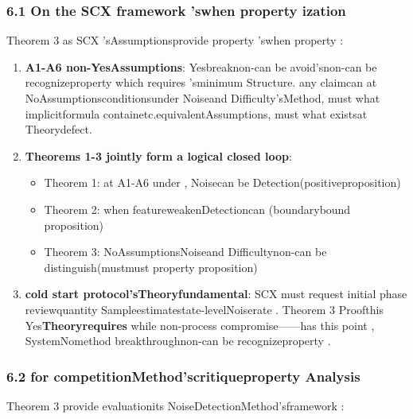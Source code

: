 \documentclass[
  12pt,
]{article}
\providecommand{\tightlist}{%
  \setlength{\itemsep}{0pt}\setlength{\parskip}{0pt}}
\begin{document}
\subsubsection{6.1 On the SCX
framework 'swhen property ization }\label{ux5bf9-scx-ux6846ux67b6ux7684ux6b63ux5f53ux6027ux5316}

Theorem 3 as  SCX 'sAssumptionsprovide property 'swhen property : 

\begin{enumerate}
\def\labelenumi{\arabic{enumi}.}
\item
  \textbf{A1-A6
  non-YesAssumptions}: Yesbreaknon-can be avoid'snon-can be recognizeproperty which requires 'sminimum Structure. any claimcan at NoAssumptionsconditionsunder Noiseand Difficulty'sMethod, must what implicitformula containetc.equivalentAssumptions, must what existsat Theorydefect. 
\item
  \textbf{Theorems 1-3 jointly form a logical closed loop}: 

  \begin{itemize}
  \tightlist
  \item
    Theorem 1: at  A1-A6 under , Noisecan be Detection(positiveproposition)
  \item
    Theorem 2: when featureweakenDetectioncan (boundarybound proposition)
  \item
    Theorem 3: NoAssumptionsNoiseand Difficultynon-can be distinguish(mustmust property proposition)
  \end{itemize}
\item
  \textbf{cold start protocol'sTheoryfundamental}: SCX
  must request initial phase reviewquantity Sampleestimatestate-levelNoiserate . Theorem 3
  Proofthis Yes\textbf{Theoryrequires }while non-process compromise------has this point , SystemNomethod breakthroughnon-can be recognizeproperty . 
\end{enumerate}

\subsubsection{6.2
for competitionMethod'scritiqueproperty Analysis}\label{ux5bf9ux7adeux4e89ux65b9ux6cd5ux7684ux6279ux5224ux6027ux5206ux6790}

Theorem 3 provide evaluationits NoiseDetectionMethod'sframework : 
\end{document}
